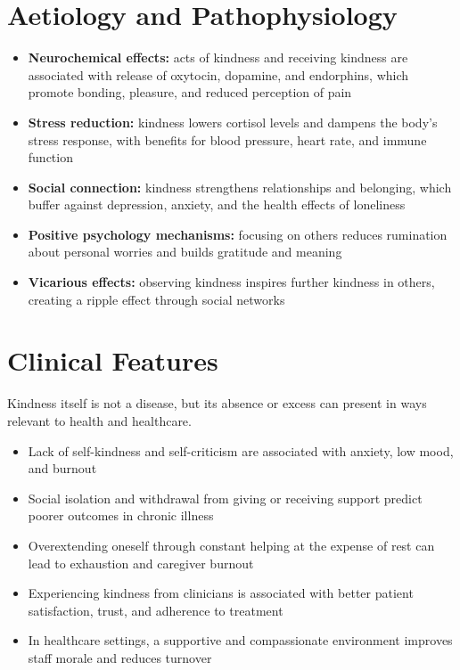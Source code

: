 \section*{Aetiology and Pathophysiology}
\begin{itemize}
    \item \textbf{Neurochemical effects:} acts of kindness and receiving kindness are associated with release of oxytocin, dopamine, and endorphins, which promote bonding, pleasure, and reduced perception of pain
    \item \textbf{Stress reduction:} kindness lowers cortisol levels and dampens the body's stress response, with benefits for blood pressure, heart rate, and immune function
    \item \textbf{Social connection:} kindness strengthens relationships and belonging, which buffer against depression, anxiety, and the health effects of loneliness
    \item \textbf{Positive psychology mechanisms:} focusing on others reduces rumination about personal worries and builds gratitude and meaning
    \item \textbf{Vicarious effects:} observing kindness inspires further kindness in others, creating a ripple effect through social networks
\end{itemize}

\section*{Clinical Features}
Kindness itself is not a disease, but its absence or excess can present in ways relevant to health and healthcare.
\begin{itemize}
    \item Lack of self-kindness and self-criticism are associated with anxiety, low mood, and burnout
    \item Social isolation and withdrawal from giving or receiving support predict poorer outcomes in chronic illness
    \item Overextending oneself through constant helping at the expense of rest can lead to exhaustion and caregiver burnout
    \item Experiencing kindness from clinicians is associated with better patient satisfaction, trust, and adherence to treatment
    \item In healthcare settings, a supportive and compassionate environment improves staff morale and reduces turnover
\end{itemize}

